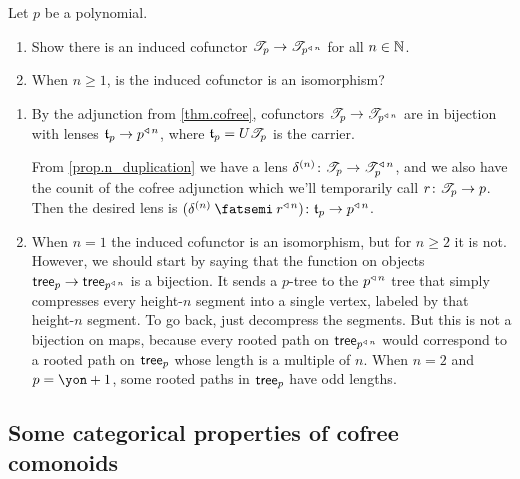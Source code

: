 \documentclass[Book-Poly]{subfiles}
\begin{document}
\begin{exercise}
Let $p$ be a polynomial.
\begin{enumerate}
    \item Show there is an induced cofunctor $\mathscr{T}_{p} \to \mathscr{T}_{p^{\mathbin{\triangleleft}\,n}}$ for all $n\in\mathbb{N}$.
    \item When $n\geq1$, is the induced cofunctor is an isomorphism? \qedhere
\end{enumerate}
\begin{solution}
\begin{enumerate}
    \item By the adjunction from \cref{thm.cofree}, cofunctors $\mathscr{T}_{p} \to \mathscr{T}_{p^{\mathbin{\triangleleft}\,n}}$ are in bijection with lenses $\mathfrak{t}_{p}\to p^{\mathbin{\triangleleft}\,n}$, where $\mathfrak{t}_{p}=U\mathscr{T}_{p}$ is the carrier.

    From \cref{prop.n_duplication} we have a lens $\delta^{(n)}\colon\mathscr{T}_{p}\to\mathscr{T}_{p}^{\mathbin{\triangleleft}\,n}$, and we also have the counit of the cofree adjunction which we'll temporarily call $r\colon\mathscr{T}_{p}\to p$. Then the desired lens is $(\delta^{(n)}\then r\tripow{n})\colon\car{t}_{p}\to p\tripow{n}$.
    \item When $n=1$ the induced cofunctor is an isomorphism, but for $n\geq 2$ it is not. However, we should start by saying that the function on objects $\mathsf{tree}_p\to\mathsf{tree}_{p^{\mathbin{\triangleleft}\,n}}$ is a bijection. It sends a $p$-tree to the $p^{\mathbin{\triangleleft}\,n}$ tree that simply compresses every height-$n$ segment into a single vertex, labeled by that height-$n$ segment. To go back, just decompress the segments. But this is not a bijection on maps, because every rooted path on $\mathsf{tree}_{p^{\mathbin{\triangleleft}\,n}}$ would correspond to a rooted path on $\mathsf{tree}_p$ whose length is a multiple of $n$. When $n=2$ and $p=\yon+1$, some rooted paths in $\mathsf{tree}_p$ have odd lengths.
\end{enumerate}
\end{solution}
\end{exercise}

\subsection{Some categorical properties of cofree comonoids}
\end{document}
